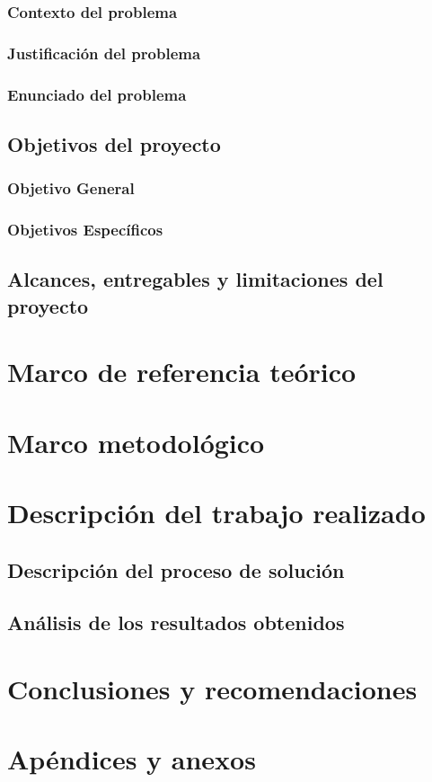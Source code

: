 \documentclass[11pt, sfdefaults=false, spanish]{scrreprt}
\begin{document}
\subsection{Contexto del problema}
\subsection{Justificación del problema}
\subsection{Enunciado del problema}

\section{Objetivos del proyecto}

\subsection{Objetivo General}
\subsection{Objetivos Específicos}

\section{Alcances, entregables y limitaciones del proyecto}

\chapter{Marco de referencia teórico}

\chapter{Marco metodológico}

\chapter{Descripción del trabajo realizado}

\section{Descripción del proceso de solución}
\section{Análisis de los resultados obtenidos}

\chapter{Conclusiones y recomendaciones}

\chapter{Apéndices y anexos}


\nocite{*}
\printbibliography
\end{document}
